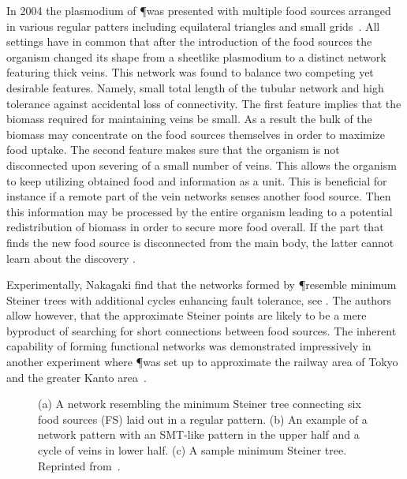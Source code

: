 			In 2004 the plasmodium of \P was presented with multiple food sources arranged in various regular patters including equilateral triangles and small grids~\cite{Nakagaki20041,nakagaki2004obtaining}. All settings have in common that after the introduction of the food sources the organism changed its shape from a sheetlike plasmodium to a distinct network featuring thick veins. This network was found to balance two competing yet desirable features. Namely, small total length of the tubular network and high tolerance against accidental loss of connectivity. The first feature implies that the biomass required for maintaining veins be small. As a result the bulk of the biomass may concentrate on the food sources themselves in order to maximize food uptake. The second feature makes sure that the organism is not disconnected upon severing of a small number of veins. This allows the organism to keep utilizing obtained food and information as a unit. This is beneficial for instance if a remote part of the vein networks senses another food source. Then this information may be processed by the entire organism leading to a potential redistribution of biomass in order to secure more food overall. If the part that finds the new food source is disconnected from the main body, the latter cannot learn about the discovery .

			Experimentally, Nakagaki \etal find that the networks formed by \P resemble minimum Steiner trees with additional cycles enhancing fault tolerance, see . The authors allow however, that the approximate Steiner points are likely to be a mere byproduct of searching for short connections between food sources. The inherent capability of forming functional networks was demonstrated impressively in another experiment where \P was set up to approximate the railway area of Tokyo and the greater Kanto area~\cite{tero2010rules}.

			\begin{figure}
				\centering
				\caption[Network of food sources by \P]{ (a) A network resembling the minimum Steiner tree connecting six food sources (FS) laid out in a regular pattern. (b) An example of a network pattern with an SMT-like pattern in the upper half and a cycle of veins in lower half. (c) A sample minimum Steiner tree. Reprinted from~\cite{nakagaki2004obtaining}.}
				\label{fig:steiner_tree_experiment}
			\end{figure}

